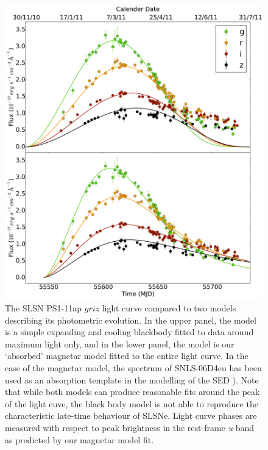 \begin{figure}
\includegraphics[width=\textwidth]{Figures/Chapter4/BB_Mag_comp}
\caption{The SLSN PS1-11ap $griz$ light curve \citep{McCrum2014} compared to two models describing its photometric evolution. In the upper panel, the model is a simple expanding and cooling blackbody fitted to data around maximum light only, and in the lower panel, the model is our `absorbed' magnetar model fitted to the entire light curve. In the case of the magnetar model, the spectrum of SNLS-06D4eu \citep{Howell2013} has been used as an absorption template in the modelling of the SED ). Note that while both models can produce reasonable fits around the peak of the light cuve, the black body model is not able to reproduce the characteristic late-time behaviour of SLSNe. Light curve phases are measured with respect to peak brightness in the rest-frame \textit{u}-band as predicted by our magnetar model fit.}
\label{fig:BB_Mag}
\end{figure}


